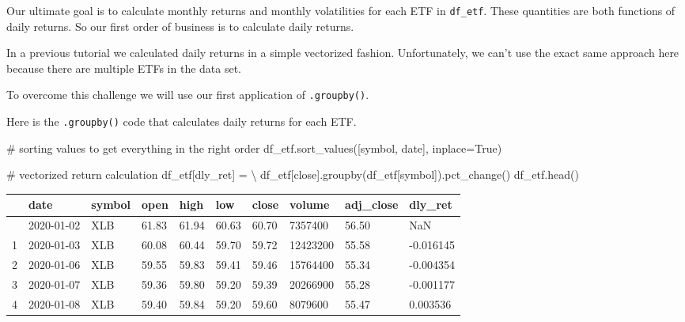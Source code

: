 \documentclass[
  letterpaper,
  DIV=11,
  numbers=noendperiod]{scrreprt}
\newenvironment{Shaded}{\begin{snugshade}}{\end{snugshade}}
\newcommand{\CommentTok}[1]{\textcolor[rgb]{0.37,0.37,0.37}{#1}}
\newcommand{\NormalTok}[1]{\textcolor[rgb]{0.00,0.23,0.31}{#1}}
\newcommand{\OperatorTok}[1]{\textcolor[rgb]{0.37,0.37,0.37}{#1}}
\newcommand{\StringTok}[1]{\textcolor[rgb]{0.13,0.47,0.30}{#1}}
\newcommand{\VariableTok}[1]{\textcolor[rgb]{0.07,0.07,0.07}{#1}}
\begin{document}
Our ultimate goal is to calculate monthly returns and monthly
volatilities for each ETF in \texttt{df\_etf}. These quantities are both
functions of daily returns. So our first order of business is to
calculate daily returns.

In a previous tutorial we calculated daily returns in a simple
vectorized fashion. Unfortunately, we can't use the exact same approach
here because there are multiple ETFs in the data set.

To overcome this challenge we will use our first application of
\texttt{.groupby()}.

Here is the \texttt{.groupby()} code that calculates daily returns for
each ETF.

\begin{Shaded}
\begin{Highlighting}[]
\CommentTok{\# sorting values to get everything in the right order}
\NormalTok{df\_etf.sort\_values([}\StringTok{\textquotesingle{}symbol\textquotesingle{}}\NormalTok{, }\StringTok{\textquotesingle{}date\textquotesingle{}}\NormalTok{], inplace}\OperatorTok{=}\VariableTok{True}\NormalTok{)}

\CommentTok{\# vectorized return calculation}
\NormalTok{df\_etf[}\StringTok{\textquotesingle{}dly\_ret\textquotesingle{}}\NormalTok{] }\OperatorTok{=} \OperatorTok{\textbackslash{}}
\NormalTok{    df\_etf[}\StringTok{\textquotesingle{}close\textquotesingle{}}\NormalTok{].groupby(df\_etf[}\StringTok{\textquotesingle{}symbol\textquotesingle{}}\NormalTok{]).pct\_change()}
\NormalTok{df\_etf.head()}
\end{Highlighting}
\end{Shaded}

\begin{longtable}[]{@{}llllllllll@{}}
\toprule\noalign{}
& date & symbol & open & high & low & close & volume & adj\_close &
dly\_ret \\
\midrule\noalign{}
\endhead
\bottomrule\noalign{}
\endlastfoot
0 & 2020-01-02 & XLB & 61.83 & 61.94 & 60.63 & 60.70 & 7357400 & 56.50 &
NaN \\
1 & 2020-01-03 & XLB & 60.08 & 60.44 & 59.70 & 59.72 & 12423200 & 55.58
& -0.016145 \\
2 & 2020-01-06 & XLB & 59.55 & 59.83 & 59.41 & 59.46 & 15764400 & 55.34
& -0.004354 \\
3 & 2020-01-07 & XLB & 59.36 & 59.80 & 59.20 & 59.39 & 20266900 & 55.28
& -0.001177 \\
4 & 2020-01-08 & XLB & 59.40 & 59.84 & 59.20 & 59.60 & 8079600 & 55.47 &
0.003536 \\
\end{longtable}
\end{document}
